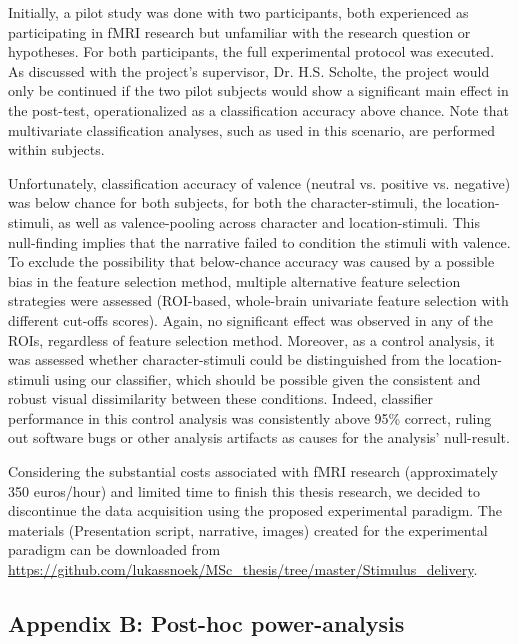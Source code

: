 \documentclass[jou,12pt,a4paper]{apa6}
\begin{document}
Initially, a pilot study was done with two participants, both experienced as participating in fMRI research but unfamiliar with the research question or hypotheses. For both participants, the full experimental protocol was executed. As discussed with the project's supervisor, Dr. H.S. Scholte, the project would only be continued if the two pilot subjects would show a significant main effect in the post-test, operationalized as a classification accuracy above chance. Note that multivariate classification analyses, such as used in this scenario, are performed within subjects.   

Unfortunately, classification accuracy of valence (neutral vs. positive vs. negative) was below chance for both subjects, for both the character-stimuli, the location-stimuli, as well as valence-pooling across character and location-stimuli. This null-finding implies that the narrative failed to condition the stimuli with valence. To exclude the possibility that below-chance accuracy was caused by a possible bias in the feature selection method, multiple alternative feature selection strategies were assessed (ROI-based, whole-brain univariate feature selection with different cut-offs scores). Again, no significant effect was observed in any of the ROIs, regardless of feature selection method. Moreover, as a control analysis, it was assessed whether character-stimuli could be distinguished from the location-stimuli using our classifier, which should be possible given the consistent and robust visual dissimilarity between these conditions. Indeed, classifier performance in this control analysis was consistently above 95\% correct, ruling out software bugs or other analysis artifacts as causes for the analysis' null-result.

Considering the substantial costs associated with fMRI research (approximately 350 euros/hour) and limited time to finish this thesis research, we decided to discontinue the data acquisition using the proposed experimental paradigm. The materials (Presentation script, narrative, images) created for the experimental paradigm can be downloaded from \url{https://github.com/lukassnoek/MSc_thesis/tree/master/Stimulus_delivery}.

\newpage
\vspace*{1px}
\subsection{\LARGE \textnormal{Appendix B: Post-hoc power-analysis}}
\vspace{10px}
\end{document}
